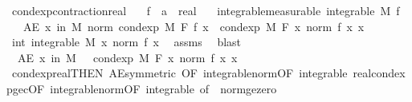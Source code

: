 \begin{isabellebody}
\begin{isamarkuptext}
\end{isamarkuptext}\isamarkuptrue%
\isamarkupfalse%
\ cond{\isacharunderscore}{\kern0pt}exp{\isacharunderscore}{\kern0pt}contraction{\isacharunderscore}{\kern0pt}real{\isacharcolon}{\kern0pt}\isanewline
\ \ \ f\ {\isacharcolon}{\kern0pt}{\isacharcolon}{\kern0pt}\ {\isachardoublequoteopen}{\isacharprime}{\kern0pt}a\ {\isasymRightarrow}\ real{\isachardoublequoteclose}\isanewline
\ \ \ integrable{\isacharbrackleft}{\kern0pt}measurable{\isacharbrackright}{\kern0pt}{\isacharcolon}{\kern0pt}\ {\isachardoublequoteopen}integrable\ M\ f{\isachardoublequoteclose}\isanewline
\ \ \ {\isachardoublequoteopen}AE\ x\ in\ M{\isachardot}{\kern0pt}\ norm\ {\isacharparenleft}{\kern0pt}cond{\isacharunderscore}{\kern0pt}exp\ M\ F\ f\ x{\isacharparenright}{\kern0pt}\ {\isasymle}\ cond{\isacharunderscore}{\kern0pt}exp\ M\ F\ {\isacharparenleft}{\kern0pt}{\isasymlambda}x{\isachardot}{\kern0pt}\ norm\ {\isacharparenleft}{\kern0pt}f\ x{\isacharparenright}{\kern0pt}{\isacharparenright}{\kern0pt}\ x{\isachardoublequoteclose}\isanewline
%
\isadelimproof
%
\endisadelimproof
%
\isatagproof
{}\isamarkupfalse%
{\isacharminus}{\kern0pt}\isanewline
\ \ \isamarkupfalse%
\ int{\isacharcolon}{\kern0pt}\ {\isachardoublequoteopen}integrable\ M\ {\isacharparenleft}{\kern0pt}{\isasymlambda}x{\isachardot}{\kern0pt}\ norm\ {\isacharparenleft}{\kern0pt}f\ x{\isacharparenright}{\kern0pt}{\isacharparenright}{\kern0pt}{\isachardoublequoteclose}\ \isamarkupfalse%
\ assms\ \isamarkupfalse%
\ blast\isanewline
\ \ \isamarkupfalse%
\ {\isacharasterisk}{\kern0pt}{\isacharcolon}{\kern0pt}\ {\isachardoublequoteopen}AE\ x\ in\ M{\isachardot}{\kern0pt}\ {}\ {\isasymle}\ cond{\isacharunderscore}{\kern0pt}exp\ M\ F\ {\isacharparenleft}{\kern0pt}{\isasymlambda}x{\isachardot}{\kern0pt}\ norm\ {\isacharparenleft}{\kern0pt}f\ x{\isacharparenright}{\kern0pt}{\isacharparenright}{\kern0pt}\ x{\isachardoublequoteclose}\ \isamarkupfalse%
\ cond{\isacharunderscore}{\kern0pt}exp{\isacharunderscore}{\kern0pt}real{\isacharbrackleft}{\kern0pt}THEN\ AE{\isacharunderscore}{\kern0pt}symmetric{\isacharcomma}{\kern0pt}\ OF\ integrable{\isacharunderscore}{\kern0pt}norm{\isacharbrackleft}{\kern0pt}OF\ integrable{\isacharbrackright}{\kern0pt}{\isacharbrackright}{\kern0pt}\ real{\isacharunderscore}{\kern0pt}cond{\isacharunderscore}{\kern0pt}exp{\isacharunderscore}{\kern0pt}ge{\isacharunderscore}{\kern0pt}c{\isacharbrackleft}{\kern0pt}OF\ integrable{\isacharunderscore}{\kern0pt}norm{\isacharbrackleft}{\kern0pt}OF\ integrable{\isacharbrackright}{\kern0pt}{\isacharcomma}{\kern0pt}\ of\ {}{\isacharbrackright}{\kern0pt}\ norm{\isacharunderscore}{\kern0pt}ge{\isacharunderscore}{\kern0pt}zero\ \isamarkupfalse%

\end{isabellebody}
